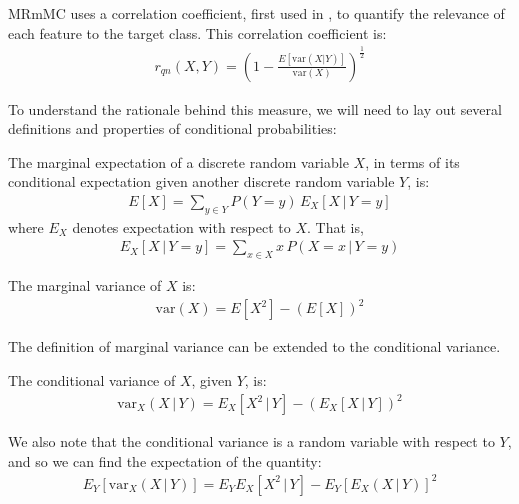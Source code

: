 \documentclass[12pt, twoside, a4paper]{report}
\def\var{\text{var}}
\begin{document}
MRmMC uses a correlation coefficient, first used in \cite{RefWorks:188}, to quantify the relevance of each feature to the target class. This correlation coefficient is:
\begin{align} \label{mrmmc:eq:relevance}
r_{qn}(X, Y) = \left( 1 - \frac{E[\var(X|Y)]}{\var(X)} \right)^{\frac{1}{2}}
\end{align}


To understand the rationale behind this measure, we will need to lay out several definitions and properties of conditional probabilities:\\

\begin{mydef}
\label{mrmmc:def:margex}
The marginal expectation of a discrete random variable $X$, in terms of its conditional expectation given another discrete random variable $Y$, is:
\begin{align*}
E[X] = \sum_{y \in Y} P(Y=y) \, E_X[X \, | \, Y=y]
\end{align*}
where $E_X$ denotes expectation with respect to $X$. That is,
\begin{align*}
E_X[X \, | \,Y=y] = \sum_{x\in X} x \, P(X=x \, | \, Y=y)
\end{align*}
\end{mydef}

\begin{mydef}
\label{mrmmc:def:margvar}
The marginal variance of $X$ is:
\begin{align*}
\var(X) = E[X^2] - \left( E[X] \right) ^2
\end{align*}
\end{mydef}

The definition of marginal variance can be extended to the conditional variance.\\

\begin{mydef}
The conditional variance of $X$, given $Y$, is:
\begin{align*}
\var_X(X \, | \, Y) = E_X[X^2 \, | \, Y] - \left( E_X[X \, | \, Y] \right)^2
\end{align*}
\end{mydef}

We also note that the conditional variance is a random variable with respect to $Y$, and so we can find the expectation of the quantity:
\begin{align*}
E_Y [ \var_X(X \, | \, Y) ] = E_YE_X[X^2 \, | \, Y] - E_Y [ E_X(X\,|\,Y) ] ^2
\end{align*}
\end{document}
